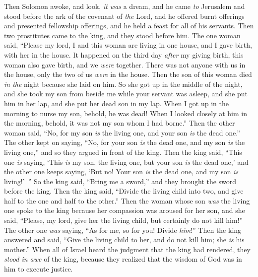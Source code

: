 \begin{biblechapter}
\verse Then Solomon awoke, and look, \textit{it was} a dream, and he came \textit{to} Jerusalem and stood before the ark of the covenant of \textit{the} Lord, and he offered burnt offerings and presented fellowship offerings, and he held a feast for all of his servants.
 Then two prostitutes came to the king, and they stood before him.
\verse The one woman said, “Please my lord, I and this woman are living in one house, and I gave birth, with her in the house.
\verse It happened on the third day \textit{after} my giving birth, this woman also gave birth, and we \textit{were} together. There was not anyone with us in the house, only the two of us \textit{were} in the house.
\verse Then the son of this woman died \textit{in the} night because she laid on him.
\verse So she got up in the middle of the night, and she took my son from beside me while your servant was asleep, and she put him in her lap, and she put her dead son in my lap.
\verse When I got up in the morning to nurse my son, behold, he was dead! When I looked closely at him in the morning, behold, it was not my son whom I had borne.”
\verse Then the other woman said, “No, for my son \textit{is} the living one, and your son \textit{is} the dead one.” The other kept on saying, “No, for your son \textit{is} the dead one, and my son \textit{is} the living one,” and so they argued in front of the king.
\verse Then the king said, “This one \textit{is} saying, ‘This \textit{is} my son, the living one, but your son \textit{is} the dead one,’ and the other one keeps saying, ‘But no! Your son \textit{is} the dead one, and my son \textit{is} living!’ ”
\verse So the king said, “Bring me a sword,” and they brought the sword before the king.
\verse Then the king said, “Divide the living child into two, and give half to the one and half to the other.”
\verse Then the woman whose son \textit{was} the living one spoke to the king because her compassion was aroused for her son, and she said, “Please, my lord, give her the living child, but certainly do not kill him!” The other one \textit{was} saying, “As for me, so for you! Divide \textit{him}!”
\verse Then the king answered and said, “Give the living child to her, and do not kill him; she \textit{is} his mother.”
\verse When all of Israel heard the judgment that the king had rendered, they \textit{stood in awe} of the king, because they realized that the wisdom of God was in him to execute justice.
\end{biblechapter}

